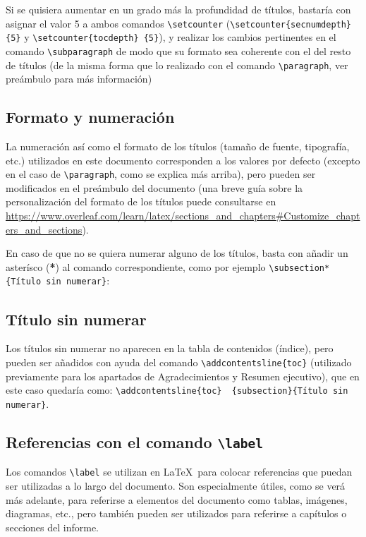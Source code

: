 \documentclass[a4paper, 11pt, spanish, twoside]{article}
\begin{document}
Si se quisiera aumentar en un grado más la profundidad de títulos, bastaría con asignar el valor 5 a ambos comandos \texttt{\textbackslash setcounter} (\texttt{\textbackslash setcounter\{secnumdepth\}\{5\}} y \texttt{\textbackslash setcounter\{tocdepth\} \{5\}}), y realizar los cambios pertinentes en el comando \texttt{\textbackslash subparagraph} de modo que su formato sea coherente con el del resto de títulos (de la misma forma que lo realizado con el comando \texttt{\textbackslash paragraph}, ver preámbulo para más información)


\subsection{Formato y numeración}

La numeración así como el formato de los títulos (tamaño de fuente, tipografía, etc.) utilizados en este documento corresponden a los valores por defecto (excepto en el caso de \texttt{\textbackslash paragraph}, como se explica más arriba), pero pueden ser modificados en el preámbulo del documento (una breve guía sobre la personalización del formato de los títulos puede consultarse en \url{https://www.overleaf.com/learn/latex/sections_and_chapters#Customize_chapters_and_sections}). 

En caso de que no se quiera numerar alguno de los títulos, basta con añadir un asterísco (\textbf{*}) al comando correspondiente, como por ejemplo \texttt{\textbackslash subsection*\{Título sin numerar\}}:


\subsection*{Título sin numerar} 

Los títulos sin numerar no aparecen en la tabla de contenidos (índice), pero pueden ser añadidos con ayuda del comando \texttt{\textbackslash addcontentsline\{toc\}} (utilizado previamente para los apartados de Agradecimientos y Resumen ejecutivo), que en este caso quedaría como: \texttt{\textbackslash addcontentsline\{toc\} \ \{subsection\}\{Título sin numerar\}}.


\subsection{Referencias con el comando \texttt{\textbackslash label}} \label{sec:referencias}

Los comandos \texttt{\textbackslash label} se utilizan en \LaTeX \ para colocar referencias que puedan ser utilizadas a lo largo del documento. Son especialmente útiles, como se verá más adelante, para referirse a elementos del documento como tablas, imágenes, diagramas, etc., pero también pueden ser utilizados para referirse a capítulos o secciones del informe. 
\end{document}
